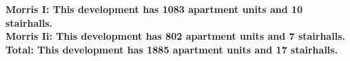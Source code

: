 \bf{Morris I}: This development has 1083 apartment units and 10 stairhalls.\\\bf{Morris Ii}: This development has 802 apartment units and 7 stairhalls.\\\bf{Total}: This development has 1885 apartment units and 17 stairhalls.\\